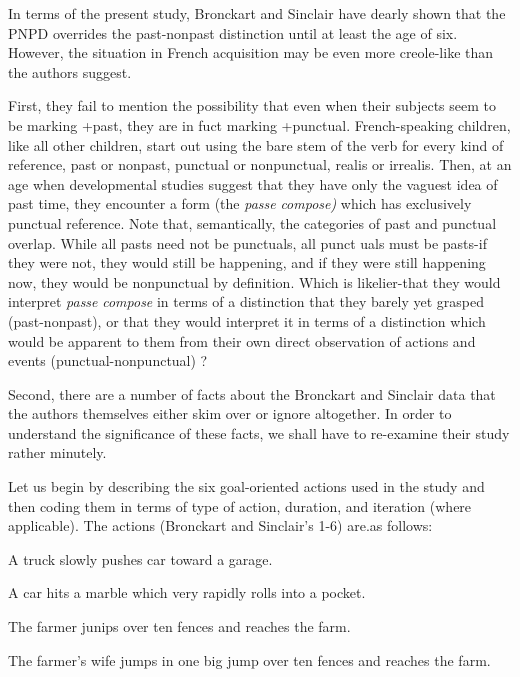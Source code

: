 
In terms of the present study, Bronckart and Sinclair have dearly shown that the PNPD overrides the past-nonpast distinction until at least the age of six. However, the situation in French acquisi\-tion may be even more creole-like than the authors suggest.

First, they fail to mention the possibility that even when their subjects seem to be marking +past, they are in fuct marking +punctual. French-speaking children, like all other children, start out using the bare stem of the verb for every kind of reference, past or nonpast, punctual or nonpunctual, realis or irrealis. Then, at an age when devel\-opmental studies suggest that they have only the vaguest idea of past time, they encounter a form (the \textit{passe} \textit{compos}\textit{e}\textit{)} which has exclusively punctual reference. Note that, semantically, the categories of past and punctual overlap. While all pasts need not be punctuals, all punct uals must be pasts-if they were not, they would still be happening, and if they were still happening now, they would be nonpunctual by defini\-tion. Which is likelier-that they would interpret \textit{passe} \textit{compose} in terms of a distinction that they barely yet grasped (past-nonpast), or that they would interpret it in terms of a distinction which would be apparent to them from their own direct observation of actions and events (punctual-nonpunctual) ?

Second, there are a number of facts about the Bronckart and Sinclair data that the authors themselves either skim over or ignore altogether. In order to understand the significance of these facts, we shall have to re-examine their study rather minutely.

Let us begin by describing the six goal-oriented actions used in the study and then coding them in terms of type of action, duration, and iteration (where applicable). The actions (Bronckart and Sinclair's 1-6) are.as follows:

\ea\label{ex:16}
 A truck slowly pushes car toward a garage.
\glt
\z

\ea\label{ex:17}
 A car hits a marble which very rapidly rolls into a pocket.
\glt
\z

\ea\label{ex:18}
 The farmer junips over ten fences and reaches the farm.
\glt
\z

\ea\label{ex:19}
 The farmer's wife jumps in one big jump over ten fences and reaches the farm.
\glt
\z


